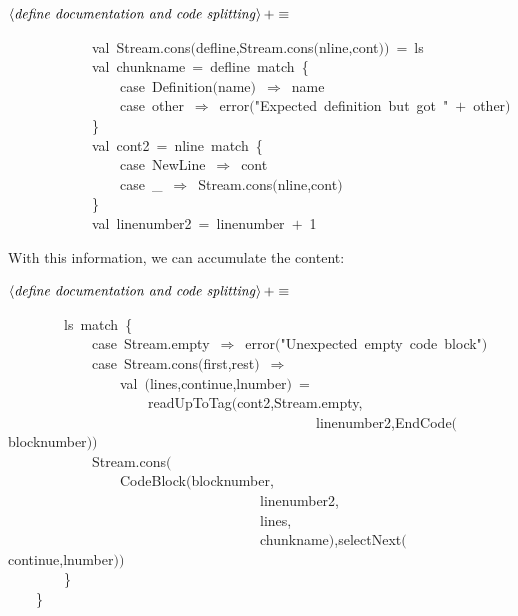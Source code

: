 \documentclass[a4paper,12pt]{article}
\begin{document}
$\left<\mbox{\emph{define documentation and code splitting}}\right>+\equiv$
\begin{program}~~~~~~~~~~~~{\vem val}~Stream.cons$($defline,Stream.cons$($nline,cont$)$$)$~=~ls
\\~~~~~~~~~~~~{\vem val}~chunkname~=~defline~{\vem match}~{\small\{}
\\~~~~~~~~~~~~~~~~{\vem case}~Definition$($name$)$~$\Rightarrow$~name
\\~~~~~~~~~~~~~~~~{\vem case}~other~$\Rightarrow$~error$($"Expected~definition~but~got~"~$+$~other$)$
\\~~~~~~~~~~~~{\small\}}
\\~~~~~~~~~~~~{\vem val}~cont2~=~nline~{\vem match}~{\small\{}
\\~~~~~~~~~~~~~~~~{\vem case}~NewLine~$\Rightarrow$~cont
\\~~~~~~~~~~~~~~~~{\vem case}~\_~$\Rightarrow$~Stream.cons$($nline,cont$)$
\\~~~~~~~~~~~~{\small\}}
\\~~~~~~~~~~~~{\vem val}~linenumber2~=~linenumber~$+$~1
\\[0.5em]\end{program}
 With this information, we can accumulate the content:

$\left<\mbox{\emph{define documentation and code splitting}}\right>+\equiv$
\begin{program}~~~~~~~~ls~{\vem match}~{\small\{}
\\~~~~~~~~~~~~{\vem case}~Stream.empty~$\Rightarrow$~error$($"Unexpected~empty~code~block"$)$
\\~~~~~~~~~~~~{\vem case}~Stream.cons$($first,rest$)$~$\Rightarrow$
\\~~~~~~~~~~~~~~~~{\vem val}~$($lines,continue,lnumber$)$~=
\\~~~~~~~~~~~~~~~~~~~~readUpToTag$($cont2,Stream.empty,
\\~~~~~~~~~~~~~~~~~~~~~~~~~~~~~~~~~~~~~~~~~~~~linenumber2,EndCode$($blocknumber$)$$)$
\\[0.5em]~~~~~~~~~~~~Stream.cons$($
\\~~~~~~~~~~~~~~~~CodeBlock$($blocknumber,
\\~~~~~~~~~~~~~~~~~~~~~~~~~~~~~~~~~~~~linenumber2,
\\~~~~~~~~~~~~~~~~~~~~~~~~~~~~~~~~~~~~lines,
\\~~~~~~~~~~~~~~~~~~~~~~~~~~~~~~~~~~~~chunkname$)$,selectNext$($continue,lnumber$)$$)$
\\~~~~~~~~{\small\}}
\\~~~~{\small\}}
\\[0.5em]\end{program}
\end{document}
